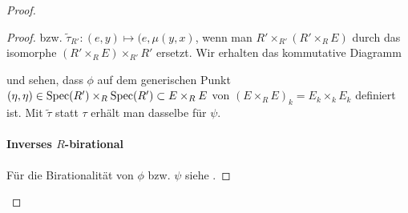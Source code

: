 \documentclass[german]{scrreprt}
\begin{document}
\begin{Satz}
\begin{proof}
\begin{Lemma}
\begin{proof}
        bzw. $\tilde\tau_{R'}\colon(e,y)\mapsto(e,\mu(y,x)$, wenn man
        $R'\times_{R'}(R'\times_R E)$ durch das isomorphe $(R'\times_R
        E)\times_{R'}R'$ ersetzt.
        Wir erhalten das kommutative Diagramm
        \begin{center}
        \end{center}
        und sehen, dass $\phi$ auf dem generischen Punkt
        $(\eta,\eta)\in\operatorname{Spec}(R')\times_R\operatorname{Spec}(R')\subset E\times_R E$
        von $(E\times_R E)_k=E_k\times_k E_k$ definiert ist.
        Mit $\tilde\tau$ statt $\tau$ erhält man dasselbe für $\psi$.
        \paragraph{Inverses $R$-birational}
        Für die Birationalität von $\phi$ bzw. $\psi$ siehe
        \cite[Propsition IV.6.10]{silverman2}.
      \end{proof}
    \end{Lemma}


\end{proof}
\end{Satz}
\end{document}

